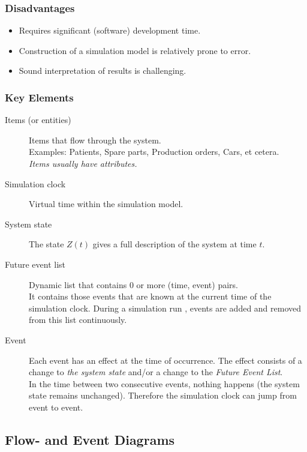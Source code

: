 \subsubsection{Disadvantages}

\begin{itemize}
	\tightlist
	\item Requires significant (software) development time.
	\item Construction of a simulation model is relatively prone to error.
	\item Sound interpretation of results is challenging.
\end{itemize}

\subsubsection{Key Elements}

\begin{description}
	\item[Items (or entities)] Items that flow through the system.\\
	Examples: Patients, Spare parts, Production orders, Cars, et cetera.\\
	\emph{Items usually have attributes.}
	\item[Simulation clock] Virtual time within the simulation model.
	\item[System state] The state $Z(t)$ gives a full description of the system
	at time $t$.
	\item[Future event list] Dynamic list that contains 0 or more (time, event)
	pairs.\\
	It contains those events that are known at the current time of the
	simulation clock. During a simulation run , events are added and
	removed from this list continuously.
	\item[Event] Each event has an effect at the time of occurrence. The effect
	consists of a change to \textit{the system state} and/or a change to the
	\textit{Future Event List}.\\
	In the time between two consecutive events, nothing happens (the
	system state remains unchanged). Therefore the simulation clock can
	jump from event to event.
\end{description}


\subsection{Flow- and Event Diagrams}


